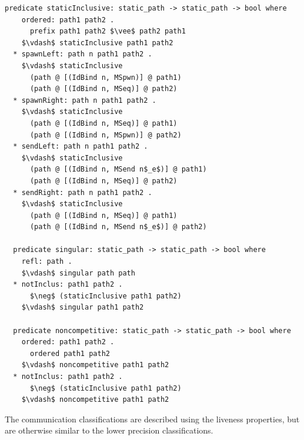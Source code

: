 \documentclass[letterpaper, 11pt]{report}
\begin{document}
\begin{lstlisting}[language=logic, mathescape]
  predicate staticInclusive: static_path -> static_path -> bool where
    ordered: path1 path2 .
      prefix path1 path2 $\vee$ path2 path1
    $\vdash$ staticInclusive path1 path2
  * spawnLeft: path n path1 path2 .
    $\vdash$ staticInclusive
      (path @ [(IdBind n, MSpwn)] @ path1)
      (path @ [(IdBind n, MSeq)] @ path2)
  * spawnRight: path n path1 path2 .
    $\vdash$ staticInclusive
      (path @ [(IdBind n, MSeq)] @ path1)
      (path @ [(IdBind n, MSpwn)] @ path2)
  * sendLeft: path n path1 path2 .
    $\vdash$ staticInclusive
      (path @ [(IdBind n, MSend n$_e$)] @ path1)
      (path @ [(IdBind n, MSeq)] @ path2)
  * sendRight: path n path1 path2 .
    $\vdash$ staticInclusive
      (path @ [(IdBind n, MSeq)] @ path1)
      (path @ [(IdBind n, MSend n$_e$)] @ path2)

  predicate singular: static_path -> static_path -> bool where
    refl: path .
    $\vdash$ singular path path
  * notInclus: path1 path2 .
      $\neg$ (staticInclusive path1 path2)
    $\vdash$ singular path1 path2

  predicate noncompetitive: static_path -> static_path -> bool where
    ordered: path1 path2 . 
      ordered path1 path2
    $\vdash$ noncompetitive path1 path2
  * notInclus: path1 path2 .
      $\neg$ (staticInclusive path1 path2)
    $\vdash$ noncompetitive path1 path2
  \end{lstlisting}

The communication classifications are described using the liveness properties, but
are otherwise similar to the lower precision classifications.
\end{document}
